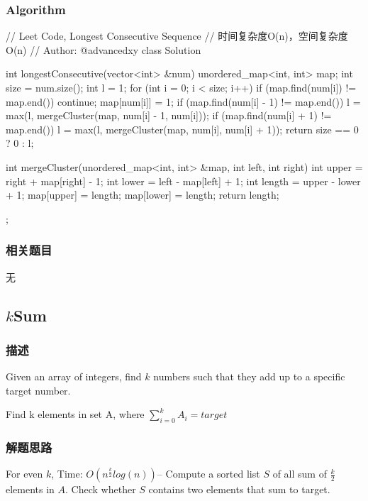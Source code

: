 \subsubsection{Algorithm}

\begin{Code}
	// Leet Code, Longest Consecutive Sequence
	// 时间复杂度O(n)，空间复杂度O(n)
	// Author: @advancedxy
	class Solution {
		int longestConsecutive(vector<int> &num) {
			unordered_map<int, int> map;
			int size = num.size();
			int l = 1;
			for (int i = 0; i < size; i++) {
				if (map.find(num[i]) != map.end()) continue;
				map[num[i]] = 1;
				if (map.find(num[i] - 1) != map.end()) 
					l = max(l, mergeCluster(map, num[i] - 1, num[i]));
				if (map.find(num[i] + 1) != map.end()) 
					l = max(l, mergeCluster(map, num[i], num[i] + 1));
			}
			return size == 0 ? 0 : l;
		}
		
		int mergeCluster(unordered_map<int, int> &map, int left, int right) {
			int upper = right + map[right] - 1;
			int lower = left - map[left] + 1;
			int length = upper - lower + 1;
			map[upper] = length;
			map[lower] = length;
			return length;
		}
	};
\end{Code}

\subsubsection{相关题目}
\begindot
\item 无
\myenddot


\subsection{$k$Sum} %
\label{sec:ksum}


\subsubsection{描述}
Given an array of integers, find $k$ numbers such that they add up to a 
specific target number.

Find k elements in set A, where $\sum_{i=0}^k{A_i}=target$


\subsubsection{解题思路}
For even $k$, Time: $O(n^{\frac{k}{2}}log(n))$--
Compute a sorted list $S$ of all sum of $\frac{k}{2}$ elements in $A$. Check whether $S$ contains two elements that sum to target.

